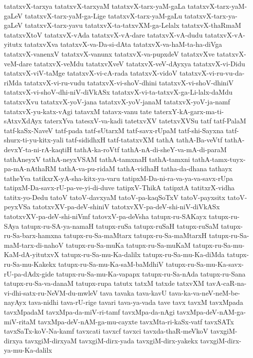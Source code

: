 {tatatxvX-tarxya
tatatxvX-tarxyaM
tatatxvX-tarx-yaM-gaLa
tatatxvX-tarx-yaM-gaLeV
tatatxvX-tarx-yaM-ga-Lige
tatatxvX-tarx-yaM-gaLu
tatatxvX-tarx-ya-gaLeV
tatatxvX-tarx-yavu
tatatxvX-ta-tatxvXM-ga-Lelalx
tatatxvX-thaRmaM
tatatxvXtoV
tatatxvX-vAda
tatatxvX-vA-dare
tatatxvX-vA-dudu
tatatxvX-vA-yitutx
tatatxvXva
tatatxvX-va-Da-si-dAta
tatatxvX-va-haM-ta-ha-diVga
tatatxvX-vanenxV
tatatxvX-vanunx
tatatxvX-va-pupxdeV
tatatxvXve
tatatxvX-veM-dare
tatatxvX-veMdu
tatatxvXveV
tatatxvX-veV-dAyxya
tatatxvX-vi-Didu
tatatxvX-viV-taMge
tatatxvX-vi-cA-rada
tatatxvX-vidoV
tatatxvX-vi-ru-vu-da-riMda
tatatxvX-vi-ru-vudu
tatatxvX-vi-shoV-dhini
tatatxvX-vi-shoV-dhiniV
tatatxvX-vi-shoV-dhi-niV-diVkASx
tatatxvX-vi-ta-tatxvX-ga-Li-lalx-daMdu
tatatxvXvu
tatatxvX-yoV-jana
tatatxvX-yoV-janaM
tatatxvX-yoV-ja-namf
tatatxvX-yu-katx-vAgi
tatavxM
tatavx-vanu
tate
taterxY-kA-garx-ma-ti-sAtxvXdAyx
taterxYva
tatesxV-va-kadi
tatetxvXV
tatetxvXVSu
tatf
tatf-PalaM
tatf-kaSx-NaveV
tatf-pada
tatf-sUtarxM
tatf-savx-rUpaM
tatf-shi-Sayxna
tatf-shurx-ti-yu-kitx-yali
tatf-sididhxH
tatf-tatatxvXM
tathA
tathA-Ba-veVtf
tathA-devxY-ta-ni-rA-kaqtiH
tathA-ka-roVtf
tathA-nA-di-sheY-va-mA-di-paraM
tathAneyxV
tathA-neyxVSAM
tathA-tamxnaH
tathA-tamxni
tathA-tamx-tuyx-pa-mA-nAthaRM
tathA-va-pu-ridaM
tathA-vidhaH
tatha-da-dhana
tathayx
tatheYva
tatikxrX-yA-sha-kitx-ya-varu
tatipxM-Da-ni-ra-va-ya-va-savx-rUpa
tatipxM-Da-savx-rU-pa-ve-yi-di-duve
tatipxV-ThikA
tatipxtA
tatitxrX-vidha
tatitx-yo-Dedu
tatoV
tatoV-davxyaM
tatoV-pa-kaqSoTxV
tatoV-payxsitx
tatoV-peyxVSa
tatotxvXV-pa-deV-shiniV
tatotxvXV-pa-deV-shi-niV-diVkASx
tatotxvXV-pa-deV-shi-niVmf
tatovxV-pa-deVsha
tatupx-ru-SAKayx
tatupx-ru-SAya
tatupx-ru-SA-ya-namaH
tatupx-ruSa
tatupx-ruSaH
tatupx-ruSaM
tatupx-ru-Sa-barx-hamxna
tatupx-ru-Sa-maMtarx
tatupx-ru-Sa-maMtarxH
tatupx-ru-Sa-maM-tarx-di-nahoV
tatupx-ru-Sa-muKa
tatupx-ru-Sa-muKaM
tatupx-ru-Sa-mu-KaM-dA-yitutxvX
tatupx-ru-Sa-mu-Ka-dalilx
tatupx-ru-Sa-mu-Ka-diMda
tatupx-ru-Sa-mu-Kakekx
tatupx-ru-Sa-mu-Ka-saM-baMdhiV
tatupx-ru-Sa-mu-Ka-savx-rU-pa-dAdx-gide
tatupx-ru-Sa-mu-Ka-vapapx
tatupx-ru-Sa-nAda
tatupx-ru-Sana
tatupx-ru-Sa-va-danaM
tatupx-rupa
tatutx
tatxM
tatxde
tatxvXM
tavA-caR-na-vi-dhi-satx-ru-NeVM-du-mwleV
tava
tavaka
tava-kavU
tava-ka-va-neV-neM-be-nayAyx
tava-nidhi
tava-rU-rige
tavari
tava-ya-vada
tave
tavx
tavxM
tavxMpada
tavxMpadaM
tavxMpa-da-miV-ri-tamf
tavxMpa-da-nAgi
tavxMpa-deV-nAM-ga-miV-ritaM
tavxMpa-deV-nAM-ga-mu-cayxte
tavxMta-ri-kaSx-vatf
tavxSATx
tavxSaTx-koV-Na-kamf
tavxcati
tavxcf
tavxci
tavxda-thaR-meVkoV
tavxgiM-dirxya
tavxgiM-dirxyaM
tavxgiM-dirx-yada
tavxgiM-dirx-yakekx
tavxgiM-dirx-ya-mu-Ka-dalilx
}
